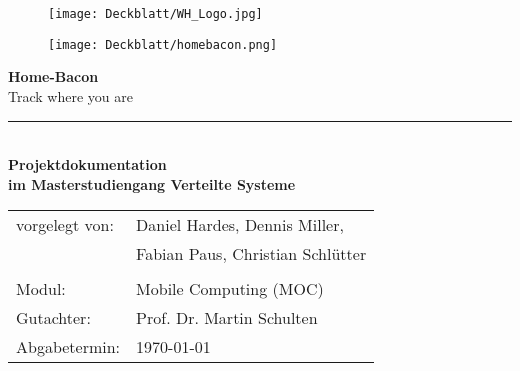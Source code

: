 \thispagestyle{plain}
\begin{titlepage}

\begin{center}
\centering
\begin{figure}
\begin{minipage}{0.65\textwidth}
\texttt{[image: Deckblatt/WH\_Logo.jpg]}
\end{minipage}
\qquad
\begin{minipage}{0.25\textwidth}
\texttt{[image: Deckblatt/homebacon.png]}
\end{minipage}
\end{figure}

\vspace*{2cm}

\Huge{\textbf{Home-Bacon}}\\
\Large{Track where you are}\\
\rule{\textwidth}{0.4pt}\\[3.0ex]

\Large{\textbf{Projektdokumentation}}\\[1.5ex]
\large{\textbf{im Masterstudiengang Verteilte Systeme}}\\[3.0ex]

\normalsize
\begin{tabular}{ll}\\
	vorgelegt von: 
	& \quad Daniel Hardes,  Dennis Miller, \\[1.2ex]
	& \quad Fabian Paus, Christian Schlütter\\[1.2ex]
	& \quad \\[1.2ex]
	Modul:  & \quad Mobile Computing (MOC) \\[1.2ex]
	Gutachter:  & \quad Prof. Dr. Martin Schulten \\[1.2ex]
	Abgabetermin:  & \quad \today\\[1.2ex]
\end{tabular}

\end{center}

\end{titlepage}
